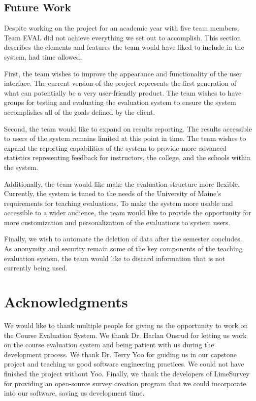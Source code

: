 \documentclass{article}
\begin{document}
\subsection{Future Work}

Despite working on the project for an academic year with five team members, Team EVAL did not achieve everything we set out to accomplish. This section describes the elements and features the team would have liked to include in the system, had time allowed. 

First, the team wishes to improve the appearance and functionality of the user interface. The current version of the project represents the first generation of what can potentially be a very user-friendly product. The team wishes to have groups for testing and evaluating the evaluation system to ensure the system accomplishes all of the goals defined by the client. 

Second, the team would like to expand on results reporting. The results accessible to users of the system remains limited at this point in time. The team wishes to expand the reporting capabilities of the system to provide more advanced statistics representing feedback for instructors, the college, and the schools within the system. 

Additionally, the team would like make the evaluation structure more flexible. Currently, the system is tuned to the needs of the University of Maine's requirements for teaching evaluations. To make the system more usable and accessible to a wider audience, the team would like to provide the opportunity for more customization and personalization of the evaluations to system users. 

Finally, we wish to automate the deletion of data after the semester concludes. As anonymity and security remain some of the key components of the teaching evaluation system, the team would like to discard information that is not currently being used. 

\section{Acknowledgments}

We would like to thank multiple people for giving us the opportunity to work on the Course Evaluation System. We thank Dr. Harlan Onsrud for letting us work on the course evaluation system and being patient with us during the development process. We thank Dr. Terry Yoo for guiding us in our capstone project and teaching us good software engineering practices. We could not have finished the project without Yoo. Finally, we thank the developers of LimeSurvey for providing an open-source survey creation program that we could incorporate into our software, saving us development time.
\end{document}
